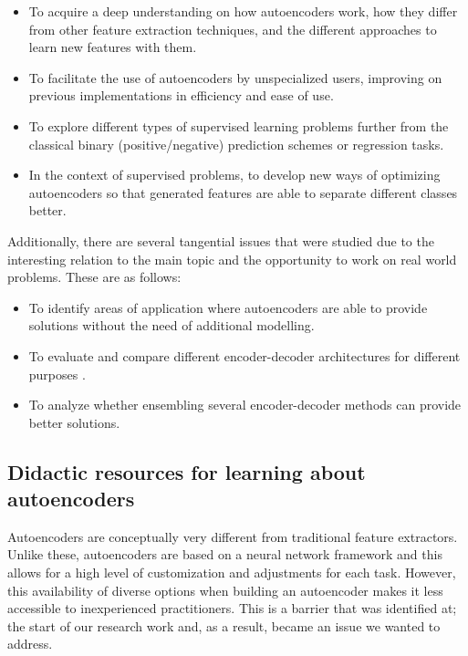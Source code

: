 \begin{itemize}
    \item To acquire a deep understanding on how autoencoders work, how they differ from other feature extraction techniques, and the different approaches to learn new features with them.
    \item To facilitate the use of autoencoders by unspecialized users, improving on previous implementations in efficiency and ease of use.
    \item To explore different types of supervised learning problems further from the classical binary (positive/negative) prediction schemes or regression tasks.
    \item In the context of supervised problems, to develop new ways of optimizing autoencoders so that generated features are able to separate different classes better.
\end{itemize}

Additionally, there are several tangential issues that were studied due to the interesting relation to the main topic and the opportunity to work on real world problems. These are as follows:

\begin{itemize}
    \item To identify areas of application where autoencoders are able to provide solutions without the need of additional modelling.
    \item To evaluate and compare different encoder-decoder architectures for different purposes .
    \item To analyze whether ensembling several encoder-decoder methods can provide better solutions.
\end{itemize}


\subsection{Didactic resources for learning about autoencoders}

Autoencoders are conceptually very different from traditional feature extractors. Unlike these, autoencoders are based on a neural network framework and this allows for a high level of customization and adjustments for each task. However, this availability of diverse options when building an autoencoder makes it less accessible to inexperienced practitioners. This is a barrier that was identified at; the start of our research work and, as a result, became an issue we wanted to address.

